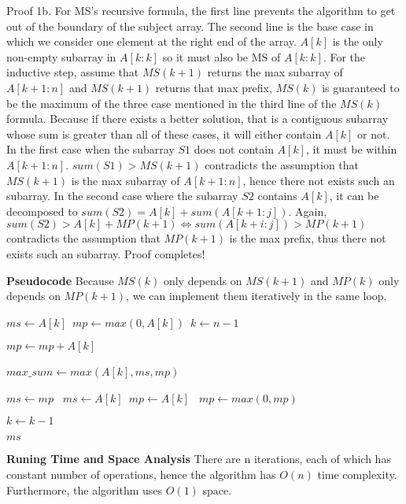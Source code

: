 \documentclass[12pt,article]{article}
\begin{document}
Proof 1b. For MS's recursive formula, the first line prevents the algorithm to get out of the boundary of the subject array. The second line is the base case in which we consider one element at the right end of the array. $A[k]$ is the only non-empty subarray in $A[k:k]$ so it must also be MS of $A[k:k]$. For the inductive step, assume that $MS(k+1)$ returns the max subarray of $A[k+1:n]$ and $MS(k+1)$ returns that max prefix, $MS(k)$ is guaranteed to be the maximum of the three case mentioned in the third line of the $MS(k)$ formula. Because if there exists a better solution, that is a contiguous subarray whose sum is greater than all of these cases, it will either contain $A[k]$ or not. In the first case when the subarray $S1$ does not contain $A[k]$, it must be within $A[k+1:n]$. $sum(S1) > MS(k+1)$ contradicts the assumption that $MS(k+1)$ is the max subarray of $A[k+1:n]$, hence there not exists such an subarray. In the second case where the subarray $S2$ contains $A[k]$, it can be decomposed to $sum(S2) = A[k] + sum(A[k+1:j])$. Again, $sum(S2) > A[k] + MP(k+1) \iff sum(A[k+i:j]) > MP(k+1)$ contradicts the assumption that $MP(k+1)$ is the max prefix, thus there not exists such an subarray. Proof completes!

\newpage
\textbf{Pseudocode}
Because $MS(k)$ only depends on $MS(k+1)$ and $MP(k)$ only depends on $MP(k+1)$, we can implement them iteratively in the same loop.

\begin{algorithm}
\caption{$(A[1:n])$}\label{alg:LSA}
\begin{algorithmic}
    \State $ms \gets A[k]$\
    \State $mp \gets max(0, A[k])$\
    \State $k \gets n - 1$\;
    
        \State $mp \gets mp + A[k]$

        \State $max\_sum \gets max(A[k], ms, mp)$\

            \State $ms \gets mp$\
            \State $ms \gets A[k]$\
            \State $mp \gets A[k]$\
        \Else
            \State $mp \gets max(0, mp)$\
        \EndIf

        \State $k \gets k - 1$
    \EndWhile

    \Return $ms$
\end{algorithmic}
\end{algorithm}

\textbf{Runing Time and Space Analysis}
There are n iterations, each of which has constant number of operations, hence the algorithm has $O(n)$ time complexity. Furthermore, the algorithm uses $O(1)$ space.
\end{document}

